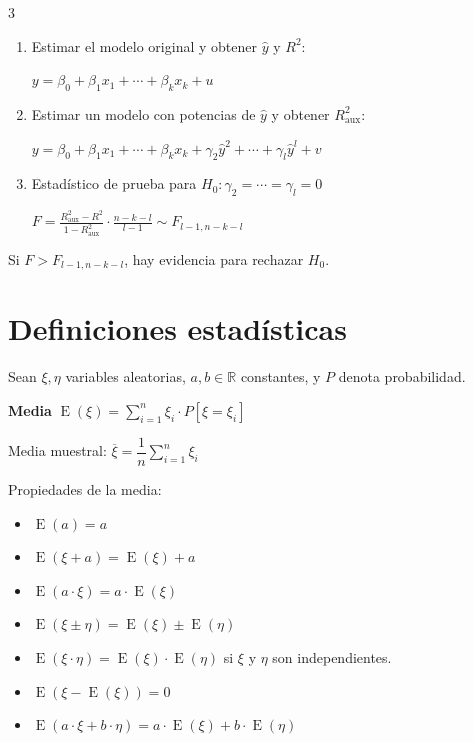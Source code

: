\documentclass[10pt, a4paper, landscape]{article}
\DeclareMathOperator{\E}{E}
\begin{document}
\begin{multicols}{3}
\begin{enumerate}[leftmargin=*]
	\item Estimar el modelo original y obtener  \( \hat{y} \) y \( R^{2} \):
	\begin{center}
		\( y = \beta_{0} + \beta_{1} x_{1} + \cdots + \beta_{k} x_{k} + u \)
	\end{center}
	\item Estimar un modelo con potencias de \( \hat{y} \) y obtener \( R_{\text{aux}}^{2} \):
	\begin{center}
		\( y = \beta_{0} + \beta_{1} x_{1} + \cdots + \beta_{k} x_{k} + \gamma_{2} \hat{y}^{2} + \cdots + \gamma_{l} \hat{y}^{l} + v \)
	\end{center}
	\item Estadístico de prueba para \( H_{0}: \gamma_{2} = \cdots = \gamma_{l} = 0 \)
	\begin{center}
		\( F = \frac{R_{\text{aux}}^{2} - R^{2}}{1 - R_{\text{aux}}^{2}} \cdot \frac{n - k - l}{l - 1} \sim F_{l - 1, n - k - l} \)
	\end{center}
\end{enumerate}

Si \( F > F_{l - 1, n - k - l} \), hay evidencia para rechazar \( H_{0} \).

\section*{Definiciones estadísticas}

Sean \( \xi, \eta \) variables aleatorias, \( a, b \in \mathbb{R} \) constantes, y \( P \) denota probabilidad.

\textbf{Media} \quad \( \E(\xi) = \sum_{i = 1}^{n} \xi_{i} \cdot P[\xi = \xi_{i}] \)

Media muestral: \quad \( \overline{\xi} = \dfrac{1}{n} \sum_{i = 1}^{n} \xi_{i} \)

Propiedades de la media:

\begin{itemize}[leftmargin=*]
	\item \( \E(a) = a \)
	\item \( \E(\xi + a) = \E(\xi) + a \)
	\item \( \E(a \cdot \xi) = a \cdot \E(\xi) \)
	\item \( \E(\xi \pm \eta) = \E(\xi) \pm \E(\eta) \)
	\item \( \E(\xi \cdot \eta) = \E(\xi) \cdot \E(\eta) \) \quad si \( \xi \) y \( \eta \) son independientes.
	\item \( \E(\xi - \E(\xi)) = 0 \)
	\item \( \E(a \cdot \xi + b \cdot \eta) = a \cdot \E(\xi) + b \cdot \E(\eta) \)
\end{itemize}


\end{multicols}
\end{document}
